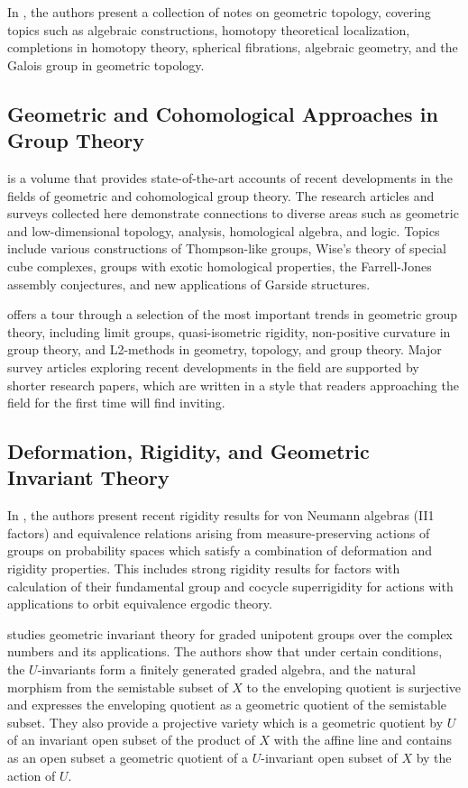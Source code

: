 \documentclass{article}
\begin{document}
In \cite{Sullivan2005GeometricTL}, the authors present a collection of notes on geometric topology, covering topics such as algebraic constructions, homotopy theoretical localization, completions in homotopy theory, spherical fibrations, algebraic geometry, and the Galois group in geometric topology.

\subsection{Geometric and Cohomological Approaches in Group Theory}

\cite{Kropholler2017GeometricAC} is a volume that provides state-of-the-art accounts of recent developments in the fields of geometric and cohomological group theory. The research articles and surveys collected here demonstrate connections to diverse areas such as geometric and low-dimensional topology, analysis, homological algebra, and logic. Topics include various constructions of Thompson-like groups, Wise's theory of special cube complexes, groups with exotic homological properties, the Farrell-Jones assembly conjectures, and new applications of Garside structures.

\cite{Bridson2009GeometricAC} offers a tour through a selection of the most important trends in geometric group theory, including limit groups, quasi-isometric rigidity, non-positive curvature in group theory, and L2-methods in geometry, topology, and group theory. Major survey articles exploring recent developments in the field are supported by shorter research papers, which are written in a style that readers approaching the field for the first time will find inviting.

\subsection{Deformation, Rigidity, and Geometric Invariant Theory}

In \cite{algebras2006DeformationAR}, the authors present recent rigidity results for von Neumann algebras (II1 factors) and equivalence relations arising from measure-preserving actions of groups on probability spaces which satisfy a combination of deformation and rigidity properties. This includes strong rigidity results for factors with calculation of their fundamental group and cocycle superrigidity for actions with applications to orbit equivalence ergodic theory.

\cite{Berczi2016GeometricIT} studies geometric invariant theory for graded unipotent groups over the complex numbers and its applications. The authors show that under certain conditions, the $U$-invariants form a finitely generated graded algebra, and the natural morphism from the semistable subset of $X$ to the enveloping quotient is surjective and expresses the enveloping quotient as a geometric quotient of the semistable subset. They also provide a projective variety which is a geometric quotient by $U$ of an invariant open subset of the product of $X$ with the affine line and contains as an open subset a geometric quotient of a $U$-invariant open subset of $X$ by the action of $U$.
\end{document}
